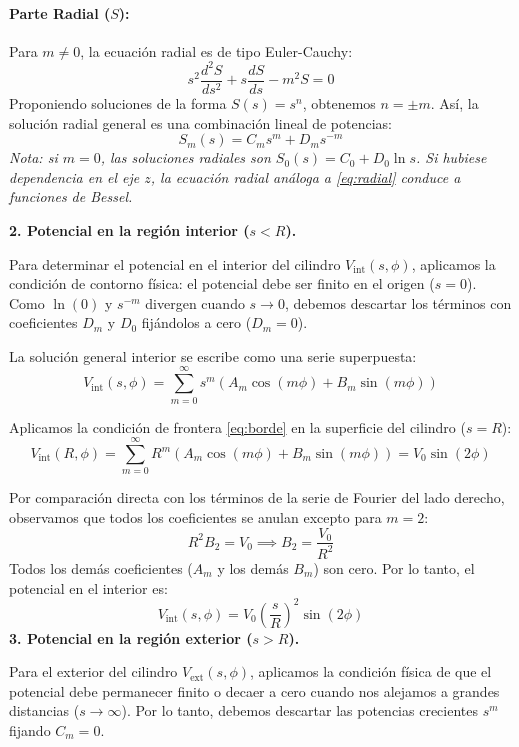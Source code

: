 \documentclass[11pt]{article}
\begin{document}
\paragraph{Parte Radial ($S$):}
Para $m \neq 0$, la ecuación radial es de tipo Euler-Cauchy:
\begin{equation}\label{eq:radial}
s^2 \frac{d^2 S}{ds^2} + s \frac{dS}{ds} - m^2 S = 0
\end{equation}
Proponiendo soluciones de la forma $S(s) = s^n$, obtenemos $n = \pm m$. Así, la solución radial general es una combinación lineal de potencias:
\begin{equation*}
S_m(s) = C_m s^m + D_m s^{-m}
\end{equation*}
\emph{Nota: si $m=0$, las soluciones radiales son $S_0(s)=C_0+D_0\ln s$. Si hubiese dependencia en el eje $z$, la ecuación radial análoga a \eqref{eq:radial} conduce a funciones de Bessel.}

\textbf{2. Potencial en la región interior ($s<R$).}\par
Para determinar el potencial en el interior del cilindro $V_{\text{int}}(s, \phi)$, aplicamos la condición de contorno física: el potencial debe ser finito en el origen ($s = 0$). Como $\ln(0)$ y $s^{-m}$ divergen cuando $s \to 0$, debemos descartar los términos con coeficientes $D_m$ y $D_0$ fijándolos a cero ($D_m = 0$).

La solución general interior se escribe como una serie superpuesta:
\begin{equation*}
V_{\text{int}}(s, \phi) = \sum_{m=0}^{\infty} s^m \left( A_m \cos(m\phi) + B_m \sin(m\phi) \right)
\end{equation*}

Aplicamos la condición de frontera \eqref{eq:borde} en la superficie del cilindro ($s = R$):
\begin{equation*}
V_{\text{int}}(R, \phi) = \sum_{m=0}^{\infty} R^m \left( A_m \cos(m\phi) + B_m \sin(m\phi) \right) = V_0 \sin(2\phi)
\end{equation*}

Por comparación directa con los términos de la serie de Fourier del lado derecho, observamos que todos los coeficientes se anulan excepto para $m = 2$:
\begin{equation*}
R^2 B_2 = V_0 \implies B_2 = \frac{V_0}{R^2}
\end{equation*}
Todos los demás coeficientes ($A_m$ y los demás $B_m$) son cero. Por lo tanto, el potencial en el interior es:
\begin{equation}\label{eq:potencial-int}
V_{\text{int}}(s, \phi) = V_0 \left( \frac{s}{R} \right)^2 \sin(2\phi)
\end{equation}
\textbf{3. Potencial en la región exterior ($s>R$).}\par
Para el exterior del cilindro $V_{\text{ext}}(s, \phi)$, aplicamos la condición física de que el potencial debe permanecer finito o decaer a cero cuando nos alejamos a grandes distancias ($s \to \infty$). Por lo tanto, debemos descartar las potencias crecientes $s^m$ fijando $C_m = 0$.
\end{document}
